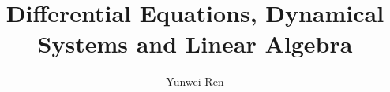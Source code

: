 

\title{Differential Equations, Dynamical Systems and Linear Algebra}
\author{Yunwei Ren}
\date{}


\maketitle
\tableofcontents

\newpage

\newpage



